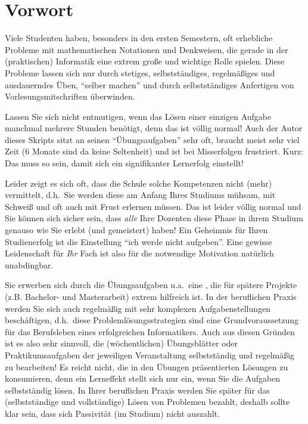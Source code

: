 \section{Vorwort}

Viele Studenten haben, besonders in den ersten Semestern, oft
erhebliche Probleme mit mathematischen Notationen und Denkweisen, die
gerade in der (praktischen) Informatik eine extrem große und wichtige
Rolle spielen. Diese Probleme lassen sich nur durch stetiges,
selbstständiges, regelmäßiges und ausdauerndes Üben, "`selber
machen"' und durch selbstständiges Anfertigen von
Vorlesungsmitschriften überwinden. 

Lassen Sie sich nicht entmutigen, wenn das Lösen einer einzigen
Aufgabe manchmal mehrere Stunden benötigt, denn das ist völlig normal!
Auch der Autor dieses Skripts sitzt an seinen "`Übungsaufgaben"' sehr 
oft, braucht meist sehr viel Zeit (6 Monate sind da keine Seltenheit) und ist
bei Misserfolgen frustriert. Kurz: Das muss so sein, damit sich ein 
signifikanter Lernerfolg einstellt!

Leider zeigt es sich oft, dass die Schule solche Kompetenzen nicht
(mehr) vermittelt, d.h.~Sie werden diese am Anfang Ihres Studiums
mühsam, mit Schweiß und oft auch mit Frust erlernen müssen. Das ist 
leider völlig normal und Sie können sich sicher sein, dass \emph{alle} Ihre Dozenten
diese Phase in ihrem Studium genauso wie Sie erlebt (und gemeistert) 
haben! Ein Geheimnis für Ihren Studienerfolg ist die Einstellung "`ich werde nicht
aufgeben"'. Eine gewisse Leidenschaft für \emph{Ihr} Fach ist also für die
notwendige Motivation natürlich unabdingbar. 

Sie erwerben sich durch die Übungsaufgaben u.a.~eine
, die für spätere Projekte (z.B. Bachelor- und
Masterarbeit) extrem hilfreich ist. In der beruflichen Praxis werden
Sie sich auch regelmäßig mit sehr komplexen Aufgabenstellungen
beschäftigen, d.h.~diese Problemlösungsstrategien sind eine
Grundvoraussetzung für das Berufsleben eines erfolgreichen
Informatikers. Auch aus diesen Gründen ist es also sehr sinnvoll, die
(wöchentlichen) Übungsblätter oder Praktikumsaufgaben der jeweiligen
Veranstaltung selbstständig und regelmäßig zu bearbeiten! Es reicht
nicht, die in den Übungen präsentierten Lösungen zu konsumieren, denn
ein Lerneffekt stellt sich nur ein, wenn Sie die Aufgaben
selbstständig lösen. In Ihrer beruflichen Praxis werden Sie später
für das (selbstständige und vollständige) Lösen von Problemen bezahlt, deshalb 
sollte klar sein, dass sich Passivität (im Studium)  nicht auszahlt. 
 
